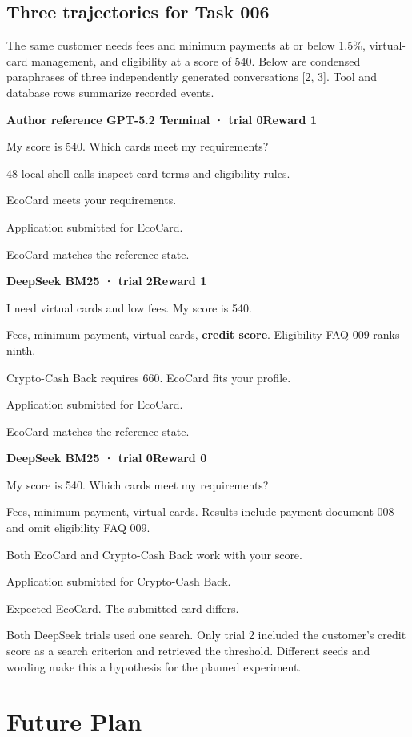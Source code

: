 \documentclass{article}
\newenvironment{tracecard}[2]{\par\addvspace{5pt}\noindent\begin{minipage}{\linewidth}
  \setlength{\parindent}{0pt}\small
  \colorbox{cardwash}{\parbox{\dimexpr\linewidth-2\fboxsep\relax}{\strut\textcolor{cardink}{\bfseries #1}\hfill #2}}\par\smallskip
}{\end{minipage}\par\addvspace{4pt}}
\newcommand{\turnline}[2]{\noindent\makebox[.17\linewidth][l]{\textcolor{cardink}{\bfseries #1}}\parbox[t]{.83\linewidth}{#2\strut}\par}
\begin{document}
\subsection{Three trajectories for Task 006}
The same customer needs fees and minimum payments at or below 1.5\%, virtual-card management, and eligibility at a score of 540. Below are condensed paraphrases of three independently generated conversations [2, 3]. Tool and database rows summarize recorded events.

\begin{tracecard}{Author reference \enspace GPT-5.2 Terminal · trial 0}{\textcolor{cardpass}{\bfseries Reward 1}}
\turnline{Customer}{My score is 540. Which cards meet my requirements?}
\turnline{Tool}{48 local shell calls inspect card terms and eligibility rules.}
\turnline{Agent}{EcoCard meets your requirements.}
\turnline{User tool}{Application submitted for EcoCard.}
\turnline{Database}{EcoCard matches the reference state.}
\end{tracecard}

\begin{tracecard}{DeepSeek \enspace BM25 · trial 2}{\textcolor{cardpass}{\bfseries Reward 1}}
\turnline{Customer}{I need virtual cards and low fees. My score is 540.}
\turnline{Search}{Fees, minimum payment, virtual cards, \textbf{credit score}. Eligibility FAQ 009 ranks ninth.}
\turnline{Agent}{Crypto-Cash Back requires 660. EcoCard fits your profile.}
\turnline{User tool}{Application submitted for EcoCard.}
\turnline{Database}{EcoCard matches the reference state.}
\end{tracecard}

\begin{tracecard}{DeepSeek \enspace BM25 · trial 0}{\textcolor{cardfail}{\bfseries Reward 0}}
\turnline{Customer}{My score is 540. Which cards meet my requirements?}
\turnline{Search}{Fees, minimum payment, virtual cards. Results include payment document 008 and omit eligibility FAQ 009.}
\turnline{Agent}{Both EcoCard and Crypto-Cash Back work with your score.}
\turnline{User tool}{Application submitted for Crypto-Cash Back.}
\turnline{Database}{Expected EcoCard. The submitted card differs.}
\end{tracecard}

Both DeepSeek trials used one search. Only trial 2 included the customer's credit score as a search criterion and retrieved the threshold. Different seeds and wording make this a hypothesis for the planned experiment.

\section{Future Plan}
\end{document}
